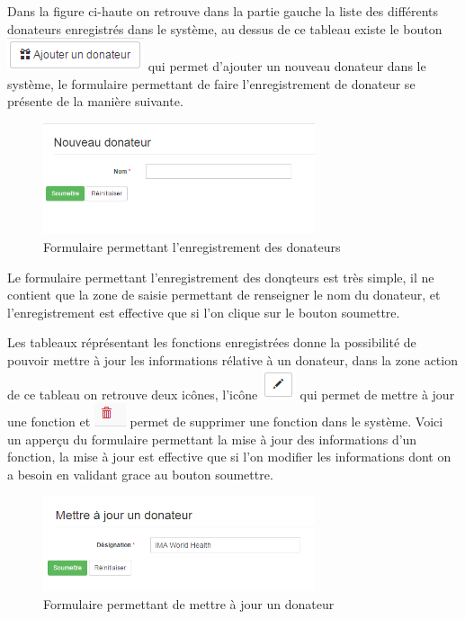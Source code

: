 \documentclass[12pt,a4paper]{report}
\begin{document}
Dans la figure ci-haute on retrouve dans la partie gauche la liste des différents donateurs enregistrés dans le système, au dessus de ce tableau existe le bouton \includegraphics[scale=1]{pic/AddDonor.png} qui permet d'ajouter un nouveau donateur dans le système, le formulaire permettant de faire l'enregistrement de donateur se présente de la manière suivante.

\begin{figure}[h]
\begin{center}
\includegraphics[width=8cm]{pic/NewDonor.png}
\end{center}
\caption{Formulaire permettant l'enregistrement des donateurs}
\label{Formulaire permettant l'enregistrement des donateurs}
\end{figure} 

Le formulaire permettant l'enregistrement des donqteurs est très simple, il ne contient que la zone de saisie permettant de renseigner le nom du donateur, et l'enregistrement est effective que si l'on clique sur le bouton soumettre. 

Les tableaux réprésentant les fonctions enregistrées donne la possibilité de pouvoir mettre à jour les informations rélative à un donateur, dans la zone action de ce tableau on retrouve deux icônes, l'icône \includegraphics[scale=0.7]{pic/EditBlack.png} qui permet de mettre à jour une fonction et \includegraphics[scale=0.7]{pic/DeleteWRed.png} permet de supprimer une fonction dans le système.
Voici un apperçu du formulaire permettant la mise à jour des informations d'un fonction, la mise à jour est effective que si l'on modifier les informations dont on a besoin en validant grace au bouton soumettre. 

\begin{figure}[h]
\begin{center}
\includegraphics[width=8cm]{pic/UpdateDonor.png}
\end{center}
\caption{Formulaire permettant de mettre à jour un donateur}
\label{Formulaire permettant de mettre à jour un donateur}
\end{figure} 
\end{document}
